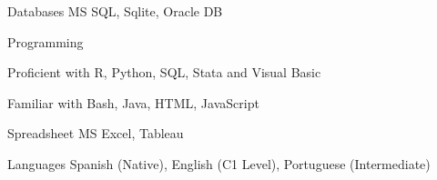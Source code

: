

\begin{cvskills}
  \cvskill
    {Databases} %
    {MS SQL, Sqlite, Oracle DB} %

  \cvskill
	{Programming}%
	{
	\begin{cvitems} %
	        \item {Proficient with R, Python, SQL, Stata and Visual Basic}
	      	\item {Familiar with Bash, Java, HTML, JavaScript}
	\end{cvitems}
    }

  \cvskill
    {Spreadsheet} %
	{MS Excel, Tableau} %

  \cvskill
    {Languages} %
    	{Spanish (Native), English (C1 Level), Portuguese (Intermediate)} %

\end{cvskills}
